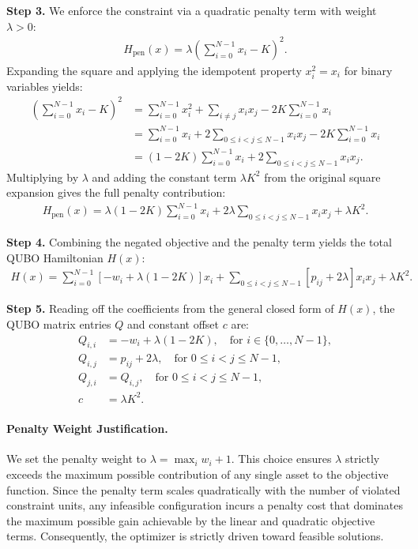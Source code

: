 \documentclass[12pt]{article}
\begin{document}
\textbf{Step 3.} We enforce the constraint via a quadratic penalty term with weight $\lambda > 0$:
\begin{align}
  H_{\text{pen}}(x) = \lambda \left( \sum_{i=0}^{N-1} x_i - K \right)^2.
\end{align}
Expanding the square and applying the idempotent property $x_i^2 = x_i$ for binary variables yields:
\begin{align}
  \left( \sum_{i=0}^{N-1} x_i - K \right)^2 &= \sum_{i=0}^{N-1} x_i^2 + \sum_{i \neq j} x_i x_j - 2K \sum_{i=0}^{N-1} x_i \\
  &= \sum_{i=0}^{N-1} x_i + 2 \sum_{0 \le i < j \le N-1} x_i x_j - 2K \sum_{i=0}^{N-1} x_i \\
  &= (1 - 2K) \sum_{i=0}^{N-1} x_i + 2 \sum_{0 \le i < j \le N-1} x_i x_j.
\end{align}
Multiplying by $\lambda$ and adding the constant term $\lambda K^2$ from the original square expansion gives the full penalty contribution:
\begin{align}
  H_{\text{pen}}(x) = \lambda(1 - 2K) \sum_{i=0}^{N-1} x_i + 2\lambda \sum_{0 \le i < j \le N-1} x_i x_j + \lambda K^2.
\end{align}

\textbf{Step 4.} Combining the negated objective and the penalty term yields the total QUBO Hamiltonian $H(x)$:
\begin{align}
  H(x) = \sum_{i=0}^{N-1} \left[ -w_i + \lambda(1 - 2K) \right] x_i + \sum_{0 \le i < j \le N-1} \left[ p_{ij} + 2\lambda \right] x_i x_j + \lambda K^2.
\end{align}

\textbf{Step 5.} Reading off the coefficients from the general closed form of $H(x)$, the QUBO matrix entries $Q$ and constant offset $c$ are:
\begin{align}
  Q_{i,i} &= -w_i + \lambda(1 - 2K), \quad \text{for } i \in \{0, \dots, N-1\}, \\
  Q_{i,j} &= p_{ij} + 2\lambda, \quad \text{for } 0 \le i < j \le N-1, \\
  Q_{j,i} &= Q_{i,j}, \quad \text{for } 0 \le i < j \le N-1, \\
  c &= \lambda K^2.
\end{align}

\paragraph{Penalty Weight Justification.}
We set the penalty weight to $\lambda = \max_{i} w_i + 1$. This choice ensures $\lambda$ strictly exceeds the maximum possible contribution of any single asset to the objective function. Since the penalty term scales quadratically with the number of violated constraint units, any infeasible configuration incurs a penalty cost that dominates the maximum possible gain achievable by the linear and quadratic objective terms. Consequently, the optimizer is strictly driven toward feasible solutions.
\end{document}
